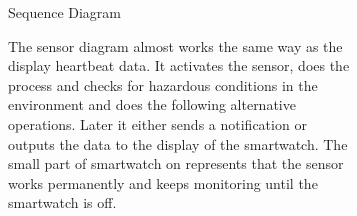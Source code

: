 \documentclass{article}
\begin{document}
		\begin{figure}[htbp]
			\centering
			\begin{subfigure}{\textwidth}
				\resizebox{\textwidth}{!}{}
				\caption{Sequence Diagram}
			\end{subfigure}
			\begin{subfigure}{\textwidth}
				The sensor diagram almost works the same way as the display heartbeat data. It activates the sensor, 
				does the process and checks for hazardous conditions in the environment and does the following alternative
				operations. Later it either sends a notification or outputs the data to the display of the smartwatch. 
				The small part of smartwatch on represents that the sensor works permanently and keeps monitoring until 
				the smartwatch is off. 
			\end{subfigure}
		\end{figure}
		\newpage
	
\end{document}
